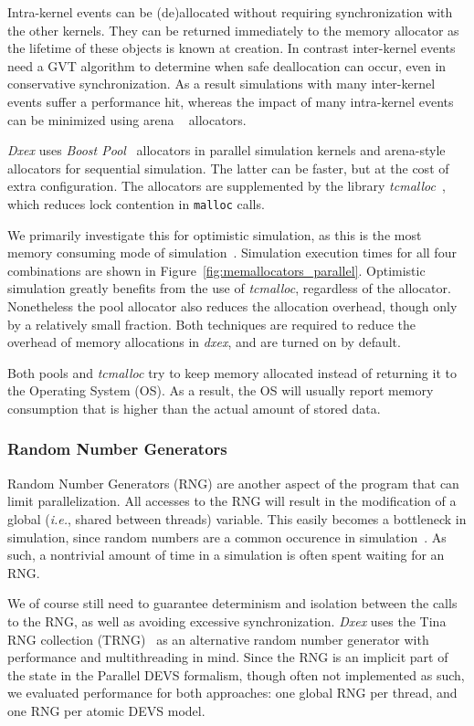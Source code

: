 Intra-kernel events can be (de)allocated without requiring synchronization with the other kernels. 
They can be returned immediately to the memory allocator as the lifetime of these objects is known at creation.
In contrast inter-kernel events need a GVT algorithm to determine when safe deallocation can occur, even in conservative synchronization.
As a result simulations with many inter-kernel events suffer a performance hit, whereas the impact of many intra-kernel events can be minimized using arena ~\cite{Arena} allocators.

\textit{Dxex} uses \textit{Boost Pool}~\cite{boostpool} allocators in parallel simulation kernels and arena-style allocators for sequential simulation.
The latter can be faster, but at the cost of extra configuration.
The allocators are supplemented by the library \textit{tcmalloc}~\cite{tcmalloc}, which reduces lock contention in \texttt{malloc} calls.

We primarily investigate this for optimistic simulation, as this is the most memory consuming mode of simulation~\cite{FujimotoBook}.
Simulation execution times for all four combinations are shown in Figure~\ref{fig:memallocators_parallel}.
Optimistic simulation greatly benefits from the use of \textit{tcmalloc}, regardless of the allocator.
Nonetheless the pool allocator also reduces the allocation overhead, though only by a relatively small fraction.
Both techniques are required to reduce the overhead of memory allocations in \textit{dxex}, and are turned on by default.

Both pools and \textit{tcmalloc} try to keep memory allocated instead of returning it to the Operating System (OS).
As a result, the OS will usually report memory consumption that is higher than the actual amount of stored data.

\subsubsection{Random Number Generators}
Random Number Generators (RNG) are another aspect of the program that can limit parallelization.
All accesses to the RNG will result in the modification of a global (\textit{i.e.}, shared between threads) variable.
This easily becomes a bottleneck in simulation, since random numbers are a common occurence in simulation~\cite{Random}.
As such, a nontrivial amount of time in a simulation is often spent waiting for an RNG.

We of course still need to guarantee determinism and isolation between the calls to the RNG, as well as avoiding excessive synchronization.
\textit{Dxex} uses the Tina RNG collection (TRNG)~\cite{PhysRevE.75.066701} as an alternative random number generator with performance and multithreading in mind.
Since the RNG is an implicit part of the state in the \textsf{Parallel DEVS} formalism, though often not implemented as such, we evaluated performance for both approaches: one global RNG per thread, and one RNG per atomic \textsf{DEVS} model.

